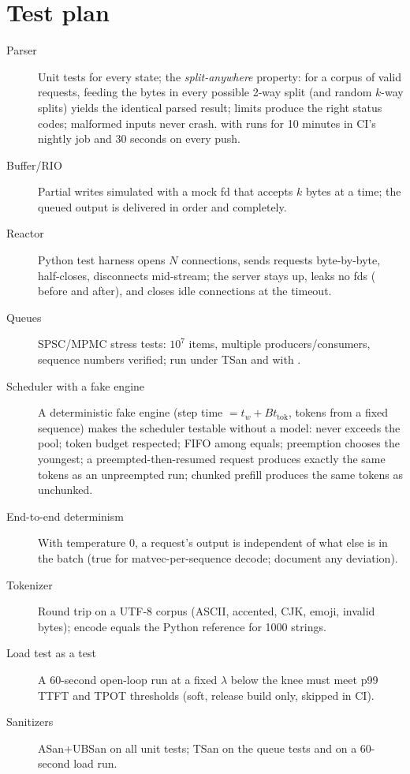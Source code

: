 \section{Test plan}

\begin{description}
  \item[Parser] Unit tests for every state; the \emph{split-anywhere} property: for a corpus of valid requests, feeding the bytes in every possible 2-way split (and random $k$-way splits) yields the identical parsed result; limits produce the right status codes; malformed inputs never crash.  with  runs for 10 minutes in CI's nightly job and 30 seconds on every push.
  \item[Buffer/RIO] Partial writes simulated with a mock fd that accepts $k$ bytes at a time; the queued output is delivered in order and completely.
  \item[Reactor] Python test harness opens $N$ connections, sends requests byte-by-byte, half-closes, disconnects mid-stream; the server stays up, leaks no fds ( before and after), and closes idle connections at the timeout.
  \item[Queues] SPSC/MPMC stress tests: $10^7$ items, multiple producers/consumers, sequence numbers verified; run under TSan and with .
  \item[Scheduler with a fake engine] A deterministic fake engine (step time $= t_w + B t_{\text{tok}}$, tokens from a fixed sequence) makes the scheduler testable without a model: never exceeds the pool; token budget respected; FIFO among equals; preemption chooses the youngest; a preempted-then-resumed request produces exactly the same tokens as an unpreempted run; chunked prefill produces the same tokens as unchunked.
  \item[End-to-end determinism] With temperature 0, a request's output is independent of what else is in the batch (true for matvec-per-sequence decode; document any deviation).
  \item[Tokenizer] Round trip on a UTF-8 corpus (ASCII, accented, CJK, emoji, invalid bytes); encode equals the Python reference for 1000 strings.
  \item[Load test as a test] A 60-second open-loop run at a fixed $\lambda$ below the knee must meet p99 TTFT and TPOT thresholds (soft, release build only, skipped in CI).
  \item[Sanitizers] ASan+UBSan on all unit tests; TSan on the queue tests and on a 60-second load run.
\end{description}

